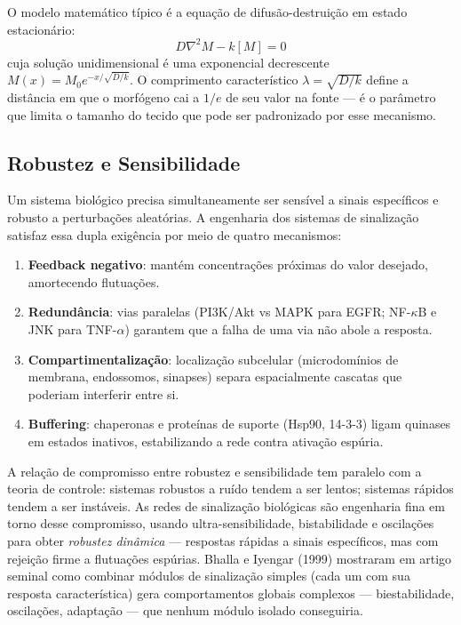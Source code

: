 O modelo matemático típico é a equação de difusão-destruição em estado
estacionário:
\begin{equation}
D \nabla^2 M - k [M] = 0
\end{equation}
cuja solução unidimensional é uma exponencial decrescente
$M(x) = M_0 e^{-x/\sqrt{D/k}}$. O comprimento característico
$\lambda = \sqrt{D/k}$ define a distância em que o morfógeno cai a $1/e$
de seu valor na fonte --- é o parâmetro que limita o tamanho do tecido que
pode ser padronizado por esse mecanismo.

\subsection{Robustez e Sensibilidade}
\label{sub:image9-robustez}

Um sistema biológico precisa simultaneamente ser sensível a sinais
específicos e robusto a perturbações aleatórias. A engenharia dos sistemas
de sinalização satisfaz essa dupla exigência por meio de quatro mecanismos:

\begin{enumerate}
\item \textbf{Feedback negativo}: mantém concentrações próximas do
valor desejado, amortecendo flutuações.
\item \textbf{Redundância}: vias paralelas (PI3K/Akt vs MAPK para EGFR; NF-$\kappa$B
e JNK para TNF-$\alpha$) garantem que a falha de uma via não abole a resposta.
\item \textbf{Compartimentalização}: localização subcelular (microdomínios de
membrana, endossomos, sinapses) separa espacialmente cascatas que poderiam
interferir entre si.
\item \textbf{Buffering}: chaperonas e proteínas de suporte (Hsp90, 14-3-3) ligam
quinases em estados inativos, estabilizando a rede contra ativação espúria.
\end{enumerate}

A relação de compromisso entre robustez e sensibilidade tem paralelo com a
teoria de controle: sistemas robustos a ruído tendem a ser lentos; sistemas
rápidos tendem a ser instáveis. As redes de sinalização biológicas são
engenharia fina em torno desse compromisso, usando ultra-sensibilidade,
bistabilidade e oscilações para obter \emph{robustez dinâmica} --- respostas
rápidas a sinais específicos, mas com rejeição firme a flutuações espúrias.
Bhalla e Iyengar (1999) mostraram em artigo seminal como combinar módulos de
sinalização simples (cada um com sua resposta característica) gera
comportamentos globais complexos --- biestabilidade, oscilações, adaptação ---
que nenhum módulo isolado conseguiria.


